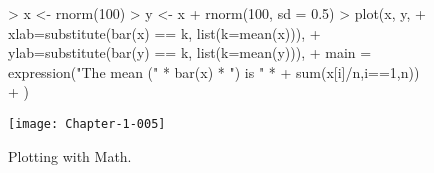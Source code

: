 \begin{figure}[h]
\begin{center}
\begin{Schunk}
\begin{Sinput}
> x <- rnorm(100)
> y <- x + rnorm(100, sd = 0.5)
> plot(x, y,
+      xlab=substitute(bar(x) == k, list(k=mean(x))),
+      ylab=substitute(bar(y) == k, list(k=mean(y))),
+      main = expression("The mean (" * bar(x) * ") is " *
+                      sum(x[i]/n,i==1,n))
+      )
\end{Sinput}
\end{Schunk}
\texttt{[image: Chapter-1-005]}
  \caption{Plotting with Math.}
  \label{fig:mathplot}
\end{center}
\end{figure}
